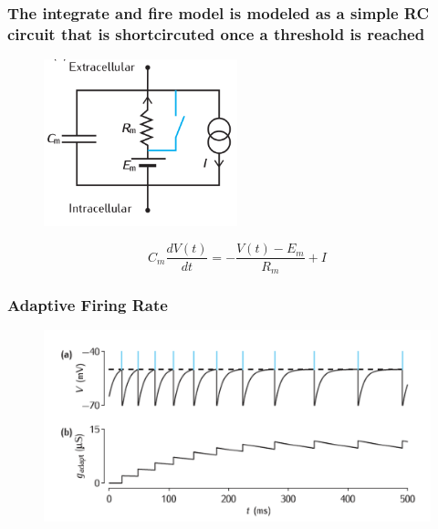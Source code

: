 \documentclass{beamer}
\begin{document}
\begin{frame}
 \frametitle{The integrate and fire model is modeled as a simple RC circuit that is shortcircuted once a threshold is reached}

\begin{figure}
 \includegraphics[width = 0.5\textwidth]{figures/rcA.png}
 \end{figure}
\pause
\begin{equation*}
C_m \frac{dV(t)}{dt} = - \frac{V(t) - E_m}{R_m} + I
\end{equation*}
 \end{frame}


\begin{frame}
	\frametitle{Adaptive Firing Rate}
	\begin{figure}
		\includegraphics[width = \textwidth]{figures/adaptation.png}
	\end{figure}
\end{frame}
\end{document}
